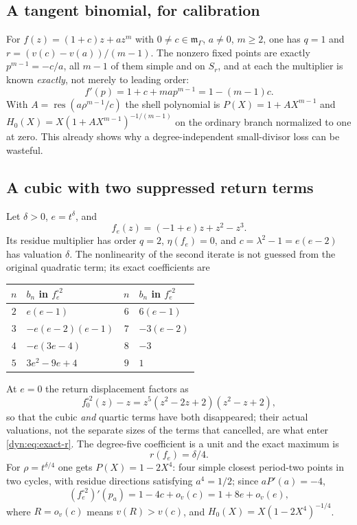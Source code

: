 \documentclass[11pt,letterpaper]{article}
\theoremstyle{definition}
\theoremstyle{remark}
\newcommand{\m}{\mathfrak m}
\newcommand{\res}{\operatorname{res}}
\numberwithin{equation}{section}
\begin{document}
\subsection{A tangent binomial, for calibration}
For $f(z)=(1+c)z+az^{m}$ with $0\ne c\in\m_\Gamma$, $a\ne0$, $m\ge2$, one
has $q=1$ and $r=(v(c)-v(a))/(m-1)$. The nonzero fixed points are exactly
$p^{m-1}=-c/a$, all $m-1$ of them simple and on $S_r$, and at each the
multiplier is known \emph{exactly}, not merely to leading order:
\begin{equation}\label{dyn:eq:binomial-mult}
 f'(p)=1+c+map^{m-1}=1-(m-1)c .
\end{equation}
With $A=\res(a\rho^{m-1}/c)$ the shell polynomial is $P(X)=1+AX^{m-1}$ and
$H_0(X)=X(1+AX^{m-1})^{-1/(m-1)}$ on the ordinary branch normalized to one
at zero. This already shows why a degree-independent small-divisor loss can
be wasteful.

\subsection{A cubic with two suppressed return terms}
\label{dyn:subsec:tuned}
Let $\delta>0$, $e=t^{\delta}$, and
\begin{equation}\label{dyn:eq:tuned-cubic}
 f_e(z)=(-1+e)z+z^{2}-z^{3} .
\end{equation}
Its residue multiplier has order $q=2$, $\eta(f_e)=0$, and
$c=\lambda^{2}-1=e(e-2)$ has valuation $\delta$. The nonlinearity of the
second iterate is not guessed from the original quadratic term; its exact
coefficients are
\begin{center}
\begin{tabular}{c l c l}
\toprule
$n$ & $b_n$ in $f_e^{\circ2}$ & $n$ & $b_n$ in $f_e^{\circ2}$\\
\midrule
$2$ & $e(e-1)$ & $6$ & $6(e-1)$\\
$3$ & $-e(e-2)(e-1)$ & $7$ & $-3(e-2)$\\
$4$ & $-e(3e-4)$ & $8$ & $-3$\\
$5$ & $3e^{2}-9e+4$ & $9$ & $1$\\
\bottomrule
\end{tabular}
\end{center}
At $e=0$ the return displacement factors as
\begin{equation}\label{dyn:eq:tuned-factor}
 f_0^{\circ2}(z)-z=z^{5}(z^{2}-2z+2)(z^{2}-z+2),
\end{equation}
so that the cubic \emph{and} quartic terms have both disappeared; their
actual valuations, not the separate sizes of the terms that cancelled, are
what enter \eqref{dyn:eq:exact-r}. The degree-five coefficient is a unit
and the exact maximum is
\begin{equation}\label{dyn:eq:tuned-r}
 \boxed{\;r(f_e)=\delta/4 .\;}
\end{equation}
For $\rho=t^{\delta/4}$ one gets $P(X)=1-2X^{4}$: four simple closest
period-two points in two cycles, with residue directions satisfying
$a^{4}=1/2$; since $aP'(a)=-4$,
\begin{equation}\label{dyn:eq:tuned-mult}
 (f_e^{\circ2})'(p_a)=1-4c+o_v(c)=1+8e+o_v(e),
\end{equation}
where $R=o_v(c)$ means $v(R)>v(c)$, and
$H_0(X)=X(1-2X^{4})^{-1/4}$.
\end{document}

